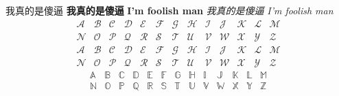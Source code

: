 \begin{tcolorbox}
        \begin{center}
                        我真的是傻逼
                \textbf{我真的是傻逼}
                \textbf{I'm foolish man}
                \textit{我真的是傻逼}
                \textit{I'm foolish man}\\
                                                \[
                                \begin{array}{ccccccccccccc}
                                \mathcal{A} & \mathcal{B} & \mathcal{C} & \mathcal{D} & \mathcal{E} & \mathcal{F} & \mathcal{G} &
                                \mathcal{H} & \mathcal{I} & \mathcal{J} & \mathcal{K} & \mathcal{L} & \mathcal{M} \\
                                \mathcal{N} & \mathcal{O} & \mathcal{P} & \mathcal{Q} & \mathcal{R} & \mathcal{S} & \mathcal{T} &
                                \mathcal{U} & \mathcal{V} & \mathcal{W} & \mathcal{X} & \mathcal{Y} & \mathcal{Z}
                                \end{array}
                                \]
                                \[
                                \begin{array}{ccccccccccccc}
                                \mathscr{A} & \mathscr{B} & \mathscr{C} & \mathscr{D} & \mathscr{E} & \mathscr{F} & \mathscr{G} &
                                \mathscr{H} & \mathscr{I} & \mathscr{J} & \mathscr{K} & \mathscr{L} & \mathscr{M} \\
                                \mathscr{N} & \mathscr{O} & \mathscr{P} & \mathscr{Q} & \mathscr{R} & \mathscr{S} & \mathscr{T} &
                                \mathscr{U} & \mathscr{V} & \mathscr{W} & \mathscr{X} & \mathscr{Y} & \mathscr{Z}
                                \end{array}
                                \]
                                \[
                                \begin{array}{ccccccccccccc}
                                \mathbb{A} & \mathbb{B} & \mathbb{C} & \mathbb{D} & \mathbb{E} & \mathbb{F} & \mathbb{G} &
                                \mathbb{H} & \mathbb{I} & \mathbb{J} & \mathbb{K} & \mathbb{L} & \mathbb{M} \\
                                \mathbb{N} & \mathbb{O} & \mathbb{P} & \mathbb{Q} & \mathbb{R} & \mathbb{S} & \mathbb{T} &
                                \mathbb{U} & \mathbb{V} & \mathbb{W} & \mathbb{X} & \mathbb{Y} & \mathbb{Z}
                                \end{array}
                                \]

        \end{center}
\end{tcolorbox}
